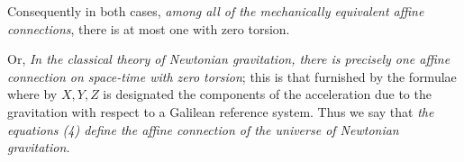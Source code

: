 Consequently in both cases, \textit{among all of the mechanically equivalent affine connections}, there is at most one with zero torsion.

Or, \textit{In the classical theory of Newtonian gravitation, there is precisely one affine connection on space-time with zero torsion}; this is that furnished by the formulae
where by $X,Y,Z$ is designated the components of the acceleration due to the gravitation with respect to a Galilean reference system. Thus we say that \textit{the equations (4) define the affine connection of the universe of Newtonian gravitation.}